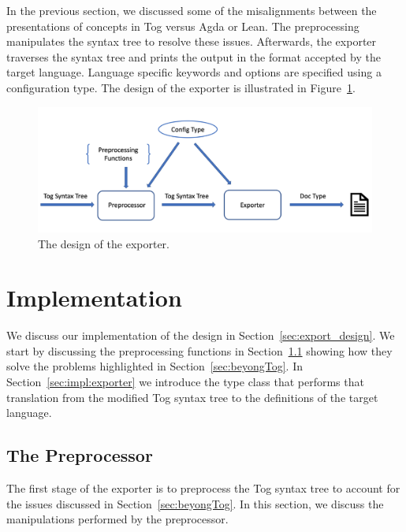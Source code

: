 In the previous section, we discussed some of the misalignments between the presentations of concepts in Tog versus Agda or Lean. 
The preprocessing manipulates the syntax tree to resolve these issues.  
Afterwards, the exporter traverses the syntax tree and prints the output in the format accepted by the target language. Language specific keywords and options are specified using a configuration type. The design of the exporter is illustrated in Figure~\ref{fig:exporter_design}. 
\begin{figure}
\includegraphics[scale=0.3]{figures/exporter_arch.png}
\caption{The design of the exporter.}
\label{fig:exporter_design}
\end{figure}

\section{Implementation}
\label{sec:exporting_agda}

We discuss our implementation of the design in Section~\ref{sec:export_design}. We start by discussing the preprocessing functions in Section~\ref{sec:exporting:challenges} showing how they solve the problems highlighted in Section~\ref{sec:beyongTog}. In Section~\ref{sec:impl:exporter} we introduce the  type class that performs that translation from the modified Tog syntax tree to the definitions of the target language. 

\subsection{The Preprocessor}
\label{sec:exporting:challenges}
The first stage of the exporter is to preprocess the Tog syntax tree to account for the issues discussed in Section~\ref{sec:beyongTog}. In this section, we discuss the manipulations performed by the preprocessor. 

